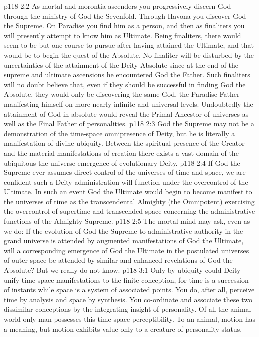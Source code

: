 \vs p118 2:2 \pc As mortal and morontia ascenders you progressively discern God through the ministry of God the Sevenfold. Through Havona you discover God the Supreme. On Paradise you find him as a person, and then as finaliters you will presently attempt to know him as Ultimate. Being finaliters, there would seem to be but one course to pursue after having attained the Ultimate, and that would be to begin the quest of the Absolute. No finaliter will be disturbed by the uncertainties of the attainment of the Deity Absolute since at the end of the supreme and ultimate ascensions he encountered God the Father. Such finaliters will no doubt believe that, even if they should be successful in finding God the Absolute, they would only be discovering the same God, the Paradise Father manifesting himself on more nearly infinite and universal levels. Undoubtedly the attainment of God in absolute would reveal the Primal Ancestor of universes as well as the Final Father of personalities.
\vs p118 2:3 God the Supreme may not be a demonstration of the time\hyp{}space omnipresence of Deity, but he is literally a manifestation of divine ubiquity. Between the spiritual presence of the Creator and the material manifestations of creation there exists a vast domain of the ubiquitous  the universe emergence of evolutionary Deity.
\vs p118 2:4 If God the Supreme ever assumes direct control of the universes of time and space, we are confident such a Deity administration will function under the overcontrol of the Ultimate. In such an event God the Ultimate would begin to become manifest to the universes of time as the transcendental Almighty (the Omnipotent) exercising the overcontrol of supertime and transcended space concerning the administrative functions of the Almighty Supreme.
\vs p118 2:5 The mortal mind may ask, even as we do: If the evolution of God the Supreme to administrative authority in the grand universe is attended by augmented manifestations of God the Ultimate, will a corresponding emergence of God the Ultimate in the postulated universes of outer space be attended by similar and enhanced revelations of God the Absolute? But we really do not know.
\vs p118 3:1 Only by ubiquity could Deity unify time\hyp{}space manifestations to the finite conception, for time is a succession of instants while space is a system of associated points. You do, after all, perceive time by analysis and space by synthesis. You co\hyp{}ordinate and associate these two dissimilar conceptions by the integrating insight of personality. Of all the animal world only man possesses this time\hyp{}space perceptibility. To an animal, motion has a meaning, but motion exhibits value only to a creature of personality status.
